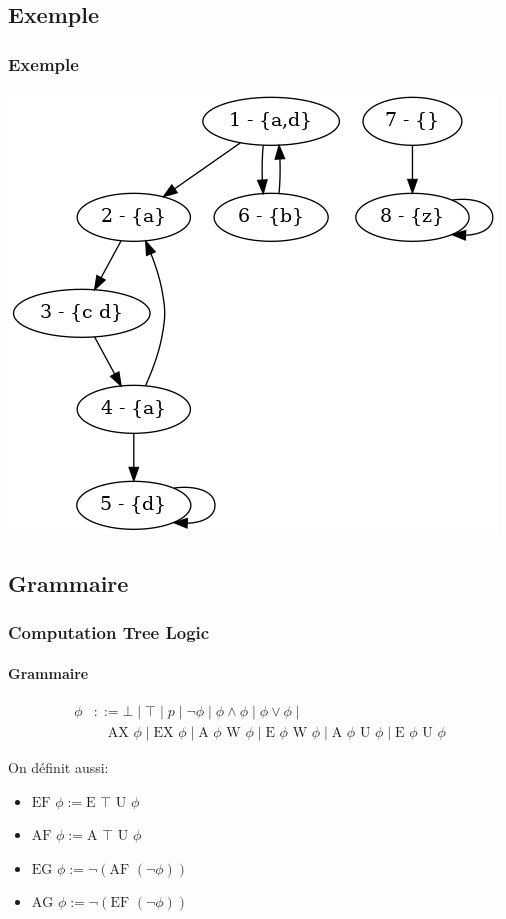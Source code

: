 \documentclass[11pt]{beamer}
\begin{document}
\subsection*{Exemple}
\begin{frame}
	\frametitle{Exemple}
	\begin{center}
		\includegraphics[scale=0.35]{imgs/g2.png}
	\end{center}
\end{frame}


\subsection{Grammaire}
\begin{frame}
	\frametitle{Computation Tree Logic}
    \framesubtitle{Grammaire}

    \begin{align*}
    \phi &::= \bot \mid \top \mid p \mid \neg \phi \mid \phi\land\phi \mid \phi\lor\phi \mid \\
    &\quad \mbox{AX }\phi \mid \mbox{EX }\phi \mid
    \mbox{A }\phi \mbox{ W } \phi \mid \mbox{E }\phi \mbox{ W } \phi \mid
    \mbox{A }\phi \mbox{ U } \phi \mid \mbox{E }\phi \mbox{ U } \phi
    \end{align*}

    \pause
    \small
    On définit aussi:
    \begin{itemize}
        \item $\mbox{EF } \phi := \mbox{E } \top \mbox{ U } \phi$
        \item $\mbox{AF } \phi := \mbox{A } \top \mbox{ U } \phi$
        \item $\mbox{EG } \phi := \neg (\mbox{AF } (\neg \phi))$
        \item $\mbox{AG } \phi := \neg (\mbox{EF } (\neg \phi))$
    \end{itemize}
\end{frame}
\end{document}
